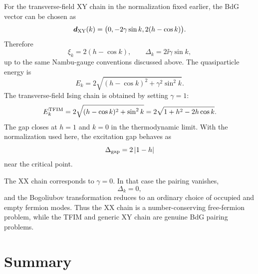 For the transverse-field XY chain in the normalization fixed earlier, the BdG
vector can be chosen as
\begin{equation}
\label{eq:bt-xy-d-vector}
    \bm{d}_{\rm XY}(k)
    =
    \bigl(0,-2\gamma\sin k,2(h-
    \cos k)\bigr).
\end{equation}
Therefore
\begin{equation}
\label{eq:bt-xy-xi-gap}
    \xi_k=2(h-\cos k),
    \qquad
    \Delta_k=2\ii\gamma\sin k,
\end{equation}
up to the same Nambu-gauge conventions discussed above.  The quasiparticle
energy is
\begin{equation}
\label{eq:bt-xy-quasiparticle-spectrum}
    E_k=2\sqrt{(h-\cos k)^2+\gamma^2\sin^2 k}.
\end{equation}
The transverse-field Ising chain is obtained by setting $\gamma=1$:
\begin{equation}
\label{eq:bt-tfim-spectrum}
    E_k^{\rm TFIM}
    =2\sqrt{(h-\cos k)^2+\sin^2 k}
    =2\sqrt{1+h^2-2h\cos k}.
\end{equation}
The gap closes at $h=1$ and $k=0$ in the thermodynamic limit.  With the
normalization used here, the excitation gap behaves as
\begin{equation}
\label{eq:bt-tfim-gap}
    \Delta_{\rm gap}=2\left|1-h\right|
\end{equation}
near the critical point.

The XX chain corresponds to $\gamma=0$.  In that case the pairing vanishes,
\begin{equation}
    \Delta_k=0,
\end{equation}
and the Bogoliubov transformation reduces to an ordinary choice of occupied and
empty fermion modes.  Thus the XX chain is a number-conserving free-fermion
problem, while the TFIM and generic XY chain are genuine BdG pairing problems.

\section{Summary}
\label{sec:bt-summary}

